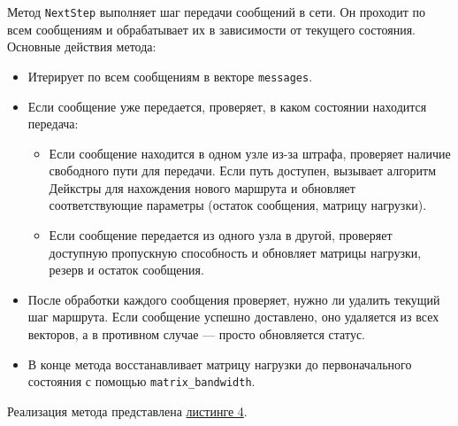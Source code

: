 \documentclass[11pt,a4paper,final]{article} %
\begin{document}
Метод \texttt{NextStep} выполняет шаг передачи сообщений в сети. Он проходит по всем сообщениям и обрабатывает их в зависимости от текущего состояния. Основные действия метода:

\begin{itemize}
	\item Итерирует по всем сообщениям в векторе \texttt{messages}.
	\item Если сообщение уже передается, проверяет, в каком состоянии находится передача:
	\begin{itemize}
		\item Если сообщение находится в одном узле из-за штрафа, проверяет наличие свободного пути для передачи. Если путь доступен, вызывает алгоритм Дейкстры для нахождения нового маршрута и обновляет соответствующие параметры (остаток сообщения, матрицу нагрузки).
		\item Если сообщение передается из одного узла в другой, проверяет доступную пропускную способность и обновляет матрицы нагрузки, резерв и остаток сообщения.
	\end{itemize}
	\item После обработки каждого сообщения проверяет, нужно ли удалить текущий шаг маршрута. Если сообщение успешно доставлено, оно удаляется из всех векторов, а в противном случае — просто обновляется статус.
	\item В конце метода восстанавливает матрицу нагрузки до первоначального состояния с помощью \texttt{matrix\_bandwidth}.
\end{itemize}

Реализация метода представлена \hyperref[lst4]{листинге 4}.
\end{document}
